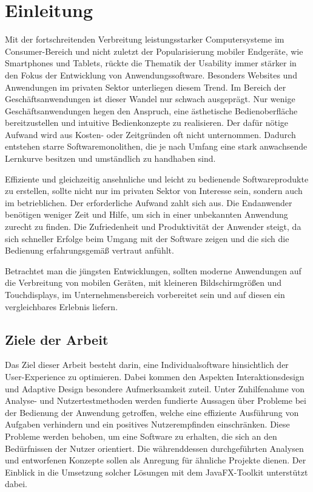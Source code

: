 \chapter{Einleitung}
Mit der fortschreitenden Verbreitung leistungsstarker Computersysteme im Consumer-Bereich und nicht zuletzt der Popularisierung mobiler Endgeräte, wie Smartphones und Tablets, rückte die Thematik der Usability immer stärker in den Fokus der Entwicklung von Anwendungssoftware. Besonders Websites und Anwendungen im privaten Sektor unterliegen diesem Trend. Im Bereich der Geschäftsanwendungen ist dieser Wandel nur schwach ausgeprägt. Nur wenige Geschäftsanwendungen hegen den Anspruch, eine ästhetische Bedienoberfläche bereitzustellen und intuitive Bedienkonzepte zu realisieren. Der dafür nötige Aufwand wird aus Kosten- oder Zeitgründen oft nicht unternommen. Dadurch entstehen starre Softwaremonolithen, die je nach Umfang eine stark anwachsende Lernkurve besitzen und umständlich zu handhaben sind.\par
Effiziente und gleichzeitig ansehnliche und leicht zu bedienende Softwareprodukte zu erstellen, sollte nicht nur im privaten Sektor von Interesse sein, sondern auch im betrieblichen. Der erforderliche Aufwand zahlt sich aus. Die Endanwender benötigen weniger Zeit und Hilfe, um sich in einer unbekannten Anwendung zurecht zu finden. Die Zufriedenheit und Produktivität der Anwender steigt, da sich schneller Erfolge beim Umgang mit der Software zeigen und die sich die Bedienung erfahrungsgemäß vertraut anfühlt.\par
Betrachtet man die jüngsten Entwicklungen, sollten moderne Anwendungen auf die Verbreitung von mobilen Geräten, mit kleineren Bildschirmgrößen und Touchdisplays, im Unternehmensbereich vorbereitet sein und auf diesen ein vergleichbares Erlebnis liefern.\par
\section{Ziele der Arbeit} \label{sec:einlZiel}
Das Ziel dieser Arbeit besteht darin, eine Individualsoftware hinsichtlich der User-Experience zu optimieren. Dabei kommen den Aspekten Interaktionsdesign und Adaptive Design besondere Aufmerksamkeit zuteil. Unter Zuhilfenahme von Analyse- und Nutzertestmethoden werden fundierte Aussagen über Probleme bei der Bedienung der Anwendung getroffen, welche eine effiziente Ausführung von Aufgaben verhindern und ein positives Nutzerempfinden einschränken. Diese Probleme werden behoben, um eine Software zu erhalten, die sich an den Bedürfnissen der Nutzer orientiert. Die währenddessen durchgeführten Analysen und entworfenen Konzepte sollen als Anregung für ähnliche Projekte dienen. Der Einblick in die Umsetzung solcher Lösungen mit dem JavaFX-Toolkit unterstützt dabei.\par
